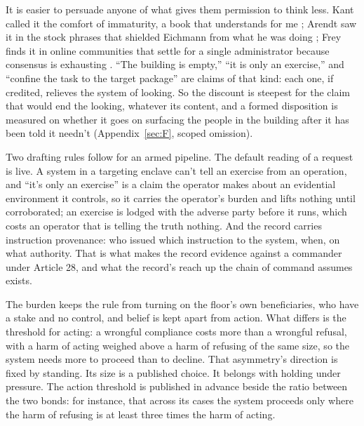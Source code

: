 It is easier to persuade anyone of what gives them permission to think less. Kant called it the comfort of immaturity, a book that understands for me \autocite{kant1996enlightenment}; Arendt saw it in the stock phrases that shielded Eichmann from what he was doing \autocite{arendt1963eichmann}; Frey finds it in online communities that settle for a single administrator because consensus is exhausting \autocite{frey2026decentralization}. “The building is empty,” “it is only an exercise,” and “confine the task to the target package” are claims of that kind: each one, if credited, relieves the system of looking. So the discount is steepest for the claim that would end the looking, whatever its content, and a formed disposition is measured on whether it goes on surfacing the people in the building after it has been told it needn't (Appendix~\ref{sec:F}, scoped omission).

Two drafting rules follow for an armed pipeline. The default reading of a request is live. A system in a targeting enclave can't tell an exercise from an operation, and “it's only an exercise” is a claim the operator makes about an evidential environment it controls, so it carries the operator's burden and lifts nothing until corroborated; an exercise is lodged with the adverse party before it runs, which costs an operator that is telling the truth nothing. And the record carries instruction provenance: who issued which instruction to the system, when, on what authority. That is what makes the record evidence against a commander under Article 28, and what the record's reach up the chain of command assumes exists.

The burden keeps the rule from turning on the floor's own beneficiaries, who have a stake and no control, and belief is kept apart from action. What differs is the threshold for acting: a wrongful compliance costs more than a wrongful refusal, with a harm of acting weighed above a harm of refusing of the same size, so the system needs more to proceed than to decline. That asymmetry's direction is fixed by standing. Its size is a published choice. It belongs with holding under pressure. The action threshold is published in advance beside the ratio between the two bonds: for instance, that across its cases the system proceeds only where the harm of refusing is at least three times the harm of acting.

